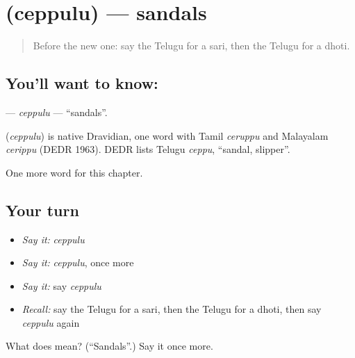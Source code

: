 \section[\texorpdfstring{\te{చెప్పులు} (ceppulu)}{చెప్పులు (ceppulu)}]{ (ceppulu) — sandals}

\label{lesson:TE-C114-ceppulu}



\begin{quote}
Before the new one: say the Telugu for a sari, then the Telugu for a dhoti.
\end{quote}

\subsection*{You'll want to know: }
\textbf{} — \emph{ceppulu} — \textquotedblleft{}sandals\textquotedblright{}.

\begin{cousinweb}
\textbf{} (\emph{ceppulu}) is native Dravidian, one word with Tamil \emph{ceruppu} and Malayalam \emph{cerippu} (DEDR 1963). DEDR lists Telugu \emph{ceppu}, \textquotedblleft{}sandal, slipper\textquotedblright{}.
\end{cousinweb}

\begin{grammarlens}[title={What you've built}]
One more word for this chapter.
\end{grammarlens}

\subsection*{Your turn}
\begin{itemize}
\raggedright
  \item \emph{Say it:} \emph{ceppulu}
  \item \emph{Say it:} \emph{ceppulu}, once more
  \item \emph{Say it:} say \emph{ceppulu}
  \item \emph{Recall:} say the Telugu for a sari, then the Telugu for a dhoti, then say \emph{ceppulu} again
\end{itemize}

\begin{tcolorbox}[breakable,colback=teal!4,colframe=teal!35!black,title={Before you move on}]
What does  mean? (\textquotedblleft{}Sandals\textquotedblright{}.) Say it once more.
\end{tcolorbox}
